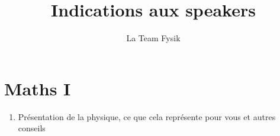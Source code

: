 \documentclass{article}
\title{Indications aux speakers}
\author{La Team Fysik} %
\begin{document}
\maketitle

\section{Maths I}

\begin{enumerate}
    \item Présentation de la physique, ce que cela représente pour vous et autres conseils
\end{enumerate}
\end{document}
